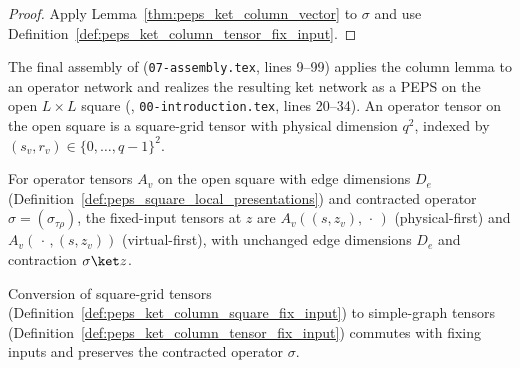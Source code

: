 \begin{proof}\leanok
    Apply Lemma~\ref{thm:peps_ket_column_vector} to $\sigma$ and use Definition~\ref{def:peps_ket_column_tensor_fix_input}.
\end{proof}

The final assembly of \cite[\S8]{OpenAI2026PolynomialPEPS} (\texttt{07-assembly.tex},
lines 9--99) applies the column lemma to an operator network and
realizes the resulting ket network as a PEPS on the open $L\times L$ square
(\cite[\S1.1]{OpenAI2026PolynomialPEPS}, \texttt{00-introduction.tex}, lines 20--34).
An operator tensor on the open square is a square-grid tensor with physical dimension $q^2$, indexed by $(s_v,r_v)\in\{0,\dots,q-1\}^2$.

\begin{definition}
    \label{def:peps_ket_column_square_fix_input}
    \leanok
    For operator tensors $A_v$ on the open square with edge dimensions $D_e$ (Definition~\ref{def:peps_square_local_presentations}) and contracted operator $\sigma=(\sigma_{\tau\rho})$, the fixed-input tensors at $z$ are $A_v((s,z_v),\,\cdot\,)$ (physical-first) and $A_v(\,\cdot\,,(s,z_v))$ (virtual-first), with unchanged edge dimensions $D_e$ and contraction $\sigma\ket z$.
    
\end{definition}

\begin{lemma}
    \label{lem:peps_ket_column_square_transport}
    \leanok
    Conversion of square-grid tensors (Definition~\ref{def:peps_ket_column_square_fix_input}) to simple-graph tensors (Definition~\ref{def:peps_ket_column_tensor_fix_input}) commutes with fixing inputs and preserves the contracted operator $\sigma$.
\end{lemma}

